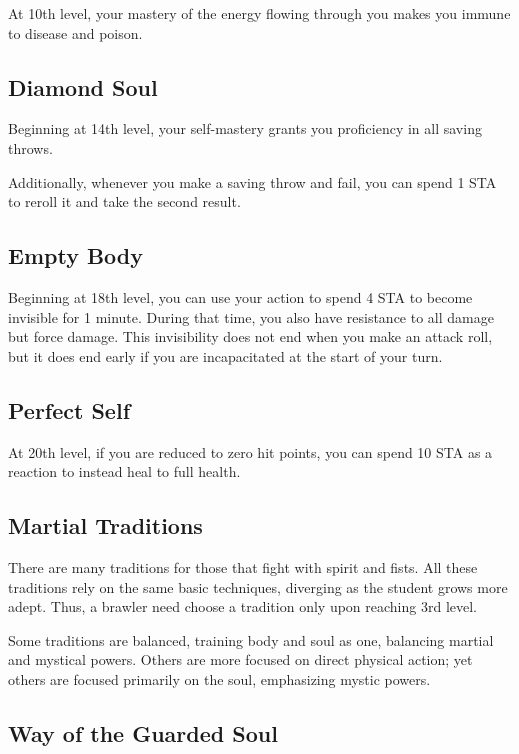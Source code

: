 At 10th level, your mastery of the energy flowing through you makes you immune to disease and poison.

\subsection{Diamond Soul}

Beginning at 14th level, your self-mastery grants you proficiency in all saving throws.

Additionally, whenever you make a saving throw and fail, you can spend 1 STA to reroll it and take the second result.

\subsection{Empty Body}

Beginning at 18th level, you can use your action to spend 4 STA to become invisible for 1 minute. During that time, you also have resistance to all damage but force damage. This invisibility does not end when you make an attack roll, but it does end early if you are incapacitated at the start of your turn.

\subsection{Perfect Self}

At 20th level, if you are reduced to zero hit points, you can spend 10 STA as a reaction to instead heal to full health.

\subsection{Martial Traditions}

There are many traditions for those that fight with spirit and fists. All these traditions rely on the same basic techniques, diverging as the student grows more adept. Thus, a brawler need choose a tradition only upon reaching 3rd level.

Some traditions are balanced, training body and soul as one, balancing martial and mystical powers. Others are more focused on direct physical action; yet others are focused primarily on the soul, emphasizing mystic powers.

\subsection{Way of the Guarded Soul}


